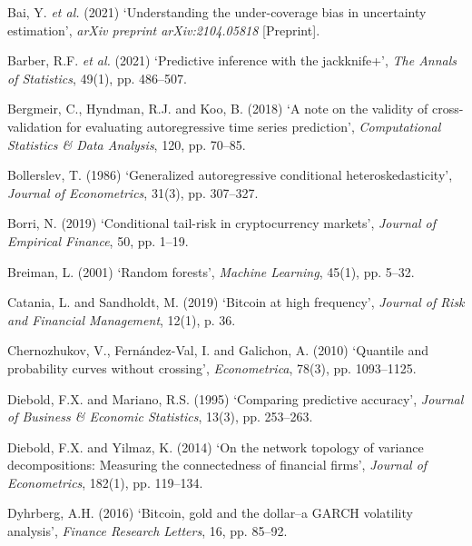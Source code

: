 \documentclass[
  a4paper,
  DIV=11,
  numbers=noendperiod]{scrreprt}
\newlength{\cslhangindent}
\newenvironment{CSLReferences}[2] %
 {\begin{list}{}{%
  \setlength{\itemindent}{0pt}
  \setlength{\leftmargin}{0pt}
  \setlength{\parsep}{0pt}
  \ifodd #1
   \setlength{\leftmargin}{\cslhangindent}
   \setlength{\itemindent}{-1\cslhangindent}
  \fi
  \setlength{\itemsep}{#2\baselineskip}}}
 {\end{list}}
\begin{document}
\label{refs}
\begin{CSLReferences}{0}{1}
Bai, Y. \emph{et al.} (2021) {`Understanding the under-coverage bias in
uncertainty estimation'}, \emph{arXiv preprint arXiv:2104.05818}
{[}Preprint{]}.

Barber, R.F. \emph{et al.} (2021) {`Predictive inference with the
jackknife+'}, \emph{The Annals of Statistics}, 49(1), pp. 486--507.

Bergmeir, C., Hyndman, R.J. and Koo, B. (2018) {`A note on the validity
of cross-validation for evaluating autoregressive time series
prediction'}, \emph{Computational Statistics \& Data Analysis}, 120, pp.
70--85.

Bollerslev, T. (1986) {`Generalized autoregressive conditional
heteroskedasticity'}, \emph{Journal of Econometrics}, 31(3), pp.
307--327.

Borri, N. (2019) {`Conditional tail-risk in cryptocurrency markets'},
\emph{Journal of Empirical Finance}, 50, pp. 1--19.

Breiman, L. (2001) {`Random forests'}, \emph{Machine Learning}, 45(1),
pp. 5--32.

Catania, L. and Sandholdt, M. (2019) {`Bitcoin at high frequency'},
\emph{Journal of Risk and Financial Management}, 12(1), p. 36.

Chernozhukov, V., Fernández-Val, I. and Galichon, A. (2010) {`Quantile
and probability curves without crossing'}, \emph{Econometrica}, 78(3),
pp. 1093--1125.

Diebold, F.X. and Mariano, R.S. (1995) {`Comparing predictive
accuracy'}, \emph{Journal of Business \& Economic Statistics}, 13(3),
pp. 253--263.

Diebold, F.X. and Yilmaz, K. (2014) {`On the network topology of
variance decompositions: Measuring the connectedness of financial
firms'}, \emph{Journal of Econometrics}, 182(1), pp. 119--134.

Dyhrberg, A.H. (2016) {`Bitcoin, gold and the dollar--a GARCH volatility
analysis'}, \emph{Finance Research Letters}, 16, pp. 85--92.


\end{CSLReferences}
\end{document}
